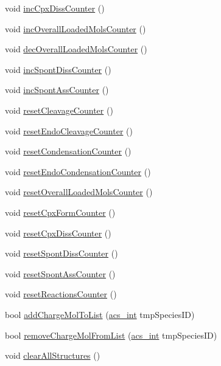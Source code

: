 \begin{DoxyCompactItemize}
void \hyperlink{a00014_a73f88a08ff9206e48063cccb1729ee6b}{inc\-Cpx\-Diss\-Counter} ()
\item 
void \hyperlink{a00014_a719b14624d9a2f891b8d4eb47649a00e}{inc\-Overall\-Loaded\-Mols\-Counter} ()
\item 
void \hyperlink{a00014_a6686b0489ed94f11c4b03c011978f9af}{dec\-Overall\-Loaded\-Mols\-Counter} ()
\item 
void \hyperlink{a00014_a0c22436405fc1ec79d33485c2e80d817}{inc\-Spont\-Diss\-Counter} ()
\item 
void \hyperlink{a00014_aa2632ded9c384c3183c3ebebb530e2d7}{inc\-Spont\-Ass\-Counter} ()
\item 
void \hyperlink{a00014_a0b1e324c651c86cb54279e022c14dc6d}{reset\-Cleavage\-Counter} ()
\item 
void \hyperlink{a00014_a3362d147de095640619d9b44f7f20bba}{reset\-Endo\-Cleavage\-Counter} ()
\item 
void \hyperlink{a00014_ac7deab8db2f581077da735c3542d8f1b}{reset\-Condensation\-Counter} ()
\item 
void \hyperlink{a00014_a55cff0bc2f8de4d3e4db471cad580a86}{reset\-Endo\-Condensation\-Counter} ()
\item 
void \hyperlink{a00014_abc04de785dddab4703fdcf52ccdf85f9}{reset\-Overall\-Loaded\-Mols\-Counter} ()
\item 
void \hyperlink{a00014_a4cf4413f3028f8c5e33991ad5ba18e21}{reset\-Cpx\-Form\-Counter} ()
\item 
void \hyperlink{a00014_a987dc7b9f211f34564343ee0eaa20dc1}{reset\-Cpx\-Diss\-Counter} ()
\item 
void \hyperlink{a00014_a9c22cb9b69207398e35c9c155e2e35ce}{reset\-Spont\-Diss\-Counter} ()
\item 
void \hyperlink{a00014_a98baed580212dad8ef48a22bfe7e1295}{reset\-Spont\-Ass\-Counter} ()
\item 
void \hyperlink{a00014_a5c8713237992b28c39199a7aea3f9ea0}{reset\-Reactions\-Counter} ()
\item 
bool \hyperlink{a00014_a7981c34d16c0b1e9e6ca3ea69aa3a8a3}{add\-Charge\-Mol\-To\-List} (\hyperlink{a00050_a8d277355641a098190360234e2ebde35}{acs\-\_\-int} tmp\-Species\-I\-D)
\item 
bool \hyperlink{a00014_aa4830018af0b99eddefcdefad877b305}{remove\-Charge\-Mol\-From\-List} (\hyperlink{a00050_a8d277355641a098190360234e2ebde35}{acs\-\_\-int} tmp\-Species\-I\-D)
\item 
void \hyperlink{a00014_aa860227725dbe5b0251a25f440773161}{clear\-All\-Structures} ()

\end{DoxyCompactItemize}
